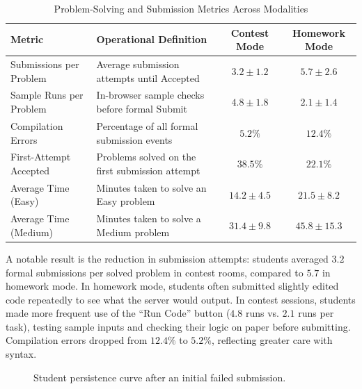 \documentclass[12pt,a4paper]{article}
\begin{document}
\begin{table}[!htbp]
\centering
\small
\caption{Problem-Solving and Submission Metrics Across Modalities}
\label{tab:debugging_metrics}
\begin{tabularx}{\linewidth}{|l|X|c|c|}
\hline
\textbf{Metric} & \textbf{Operational Definition} & \textbf{Contest Mode} & \textbf{Homework Mode} \\
\hline
Submissions per Problem & Average submission attempts until Accepted & $\mathbf{3.2 \pm 1.2}$ & $5.7 \pm 2.6$ \\
\hline
Sample Runs per Problem & In-browser sample checks before formal Submit & $\mathbf{4.8 \pm 1.8}$ & $2.1 \pm 1.4$ \\
\hline
Compilation Errors & Percentage of all formal submission events & $\mathbf{5.2\%}$ & $12.4\%$ \\
\hline
First-Attempt Accepted & Problems solved on the first submission attempt & $\mathbf{38.5\%}$ & $22.1\%$ \\
\hline
Average Time (Easy) & Minutes taken to solve an Easy problem & $14.2 \pm 4.5$ & $21.5 \pm 8.2$ \\
\hline
Average Time (Medium) & Minutes taken to solve a Medium problem & $31.4 \pm 9.8$ & $45.8 \pm 15.3$ \\
\hline
\end{tabularx}
\end{table}

A notable result is the reduction in submission attempts: students averaged $3.2$ formal submissions per solved problem in contest rooms, compared to $5.7$ in homework mode. In homework mode, students often submitted slightly edited code repeatedly to see what the server would output. In contest sessions, students made more frequent use of the ``Run Code'' button ($4.8$ runs vs. $2.1$ runs per task), testing sample inputs and checking their logic on paper before submitting. Compilation errors dropped from $12.4\%$ to $5.2\%$, reflecting greater care with syntax.

\begin{figure}[!htbp]
\centering
{}
\caption{Student persistence curve after an initial failed submission.}
\label{fig:persistence}
\end{figure}
\end{document}
